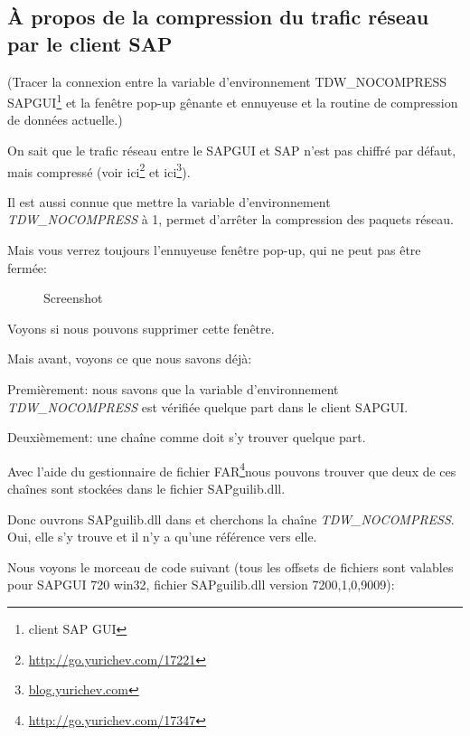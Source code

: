 \subsection{À propos de la compression du trafic réseau par le client SAP}
\label{sec:SAPGUI}

\newcommand{\TDWNC}{TDW\_NOCOMPRESS\xspace}

(Tracer la connexion entre la variable d'environnement \TDWNC{} SAPGUI\footnote{client SAP GUI}
et la fenêtre pop-up gênante et ennuyeuse et la routine de compression de données actuelle.)
 
On sait que le trafic réseau entre le SAPGUI et SAP n'est pas chiffré par défaut,
mais compressé (voir ici\footnote{\url{http://go.yurichev.com/17221}} et
ici\footnote{\href{http://go.yurichev.com/17225}{blog.yurichev.com}}).

Il est aussi connue que mettre la variable d'environnement \emph{\TDWNC} à 1,
permet d'arrêter la compression des paquets réseau.

Mais vous verrez toujours l'ennuyeuse fenêtre pop-up, qui ne peut pas être fermée:

\begin{figure}[H]
\centering
{}
\caption{Screenshot}
\end{figure}

Voyons si nous pouvons supprimer cette fenêtre.

Mais avant, voyons ce que nous savons déjà:

Premièrement: nous savons que la variable d'environnement \emph{\TDWNC} est vérifiée
quelque part dans le client SAPGUI.

Deuxièmement: une chaîne comme  doit s'y trouver
quelque part.
\newcommand{\FNURLFAR}{\footnote{\url{http://go.yurichev.com/17347}}}

Avec l'aide du gestionnaire de fichier FAR\FNURLFAR nous pouvons trouver que deux
de ces chaînes sont stockées dans le fichier SAPguilib.dll.

Donc ouvrons SAPguilib.dll dans \IDA et cherchons la chaîne \emph{\TDWNC}.
Oui, elle s'y trouve et il n'y a qu'une référence vers elle.

Nous voyons le morceau de code suivant (tous les offsets de fichiers sont valables
pour SAPGUI 720 win32, fichier SAPguilib.dll version 7200,1,0,9009):



